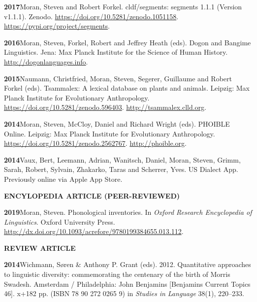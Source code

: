 \documentclass[11pt]{article}
\newcommand{\hangpara}{
 \setlength{\parindent}{0in} %
 \hangindent=0.42in %
}
\begin{document}
\vskip 6pt
\hangpara
{\bf 2017}\hspace{1ex}Moran, Steven and Robert Forkel. cldf/segments: segments 1.1.1 (Version v1.1.1). Zenodo. \url{https://doi.org/10.5281/zenodo.1051158}. \url{https://pypi.org/project/segments}.

\vskip 6pt
\hangpara
{\bf 2016}\hspace{1ex}Moran, Steven, Forkel, Robert and Jeffrey Heath (eds). Dogon and Bangime Linguistics. Jena: Max Planck Institute for the Science of Human History. \url{http://dogonlanguages.info}.

\vskip 6pt
\hangpara
{\bf 2015}\hspace{1ex}Naumann, Christfried, Moran, Steven, Segerer, Guillaume and Robert Forkel (eds). Tsammalex: A lexical database on plants and animals. Leipzig: Max Planck Institute for Evolutionary Anthropology. \url{https://doi.org/10.5281/zenodo.596403}. \url{http://tsammalex.clld.org}.

\vskip 6pt
\hangpara
{\bf 2014}\hspace{1ex}Moran, Steven, McCloy, Daniel and Richard Wright (eds). PHOIBLE Online. Leipzig: Max Planck Institute for Evolutionary Anthropology. \url{https://doi.org/10.5281/zenodo.2562767}. \url{http://phoible.org}.

\vskip 6pt
\hangpara
{\bf 2014}\hspace{1ex}Vaux, Bert, Leemann, Adrian, Wanitsch, Daniel, Moran, Steven, Grimm, Sarah, Robert, Sylvain, Zhakarko, Taras and Scherrer, Yves. US Dialect App. Previously online via Apple App Store. %


\vskip 20pt
\begin{flushleft}
{\bf ENCYLOPEDIA ARTICLE (PEER-REVIEWED)}
\end{flushleft}

\hangpara
{\bf 2019}\hspace{1ex}Moran, Steven. Phonological inventories. In \textit{Oxford Research Encyclopedia of Linguistics}. Oxford University Press. \url{http://dx.doi.org/10.1093/acrefore/9780199384655.013.112}.

\vskip 20pt
\begin{flushleft}
{\bf REVIEW ARTICLE}
\end{flushleft}


\hangpara
{\bf 2014}\hspace{1ex}Wichmann, S{\o}ren \& Anthony P. Grant (eds). 2012. Quantitative approaches to linguistic diversity: commemorating the centenary of the birth of Morris Swadesh. Amsterdam / Philadelphia: John Benjamins [Benjamins Current Topics 46]. x+182 pp. (ISBN 78 90 272 0265 9) in \textit{Studies in Language} 38(1), 220--233.
\end{document}
